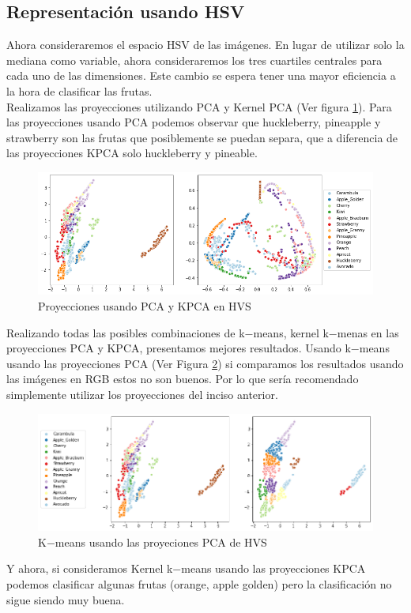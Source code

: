 \documentclass[paper=letter, fontsize=11pt]{scrartcl}
\numberwithin{equation}{section} %
\numberwithin{figure}{section} %
\numberwithin{table}{section} %
\begin{document}
\subsection{Representación usando HSV}
Ahora consideraremos el espacio HSV de las imágenes. En lugar de utilizar solo la mediana como variable, ahora consideraremos los tres cuartiles centrales para cada uno de las dimensiones. Este cambio se espera tener una mayor eficiencia a la hora de clasificar las frutas.\\

Realizamos las proyecciones utilizando PCA y Kernel PCA (Ver figura \ref{fig:pca_hvs}). Para las proyecciones usando PCA podemos observar que huckleberry, pineapple y strawberry son las frutas que posiblemente se puedan separa, que a diferencia de las proyecciones KPCA solo huckleberry y pineable.
\begin{figure}[H]
    \centering
    \includegraphics[scale=0.6]{figure/pca_hvs.png}
    \caption{Proyecciones usando PCA y KPCA en HVS}
    \label{fig:pca_hvs}
\end{figure}

Realizando todas las posibles combinaciones de k$-$means, kernel k$-$menas en las proyecciones PCA y KPCA, presentamos mejores resultados. Usando k$-$means usando las proyecciones PCA (Ver Figura \ref{fig:kmeans_pca_hsv}) si comparamos los resultados usando las imágenes en RGB estos no son buenos. Por lo que sería recomendado simplemente utilizar los proyecciones del inciso anterior.
\begin{figure}[H]
    \centering
    \includegraphics[scale=0.6]{figure/kmeans_pca_hsv.png}
    \caption{K$-$means usando las proyeciones PCA de HVS}
    \label{fig:kmeans_pca_hsv}
\end{figure}
Y ahora, si consideramos Kernel k$-$means usando las proyecciones KPCA podemos clasificar algunas frutas (orange, apple golden) pero la clasificación no sigue siendo muy buena.
\end{document}
